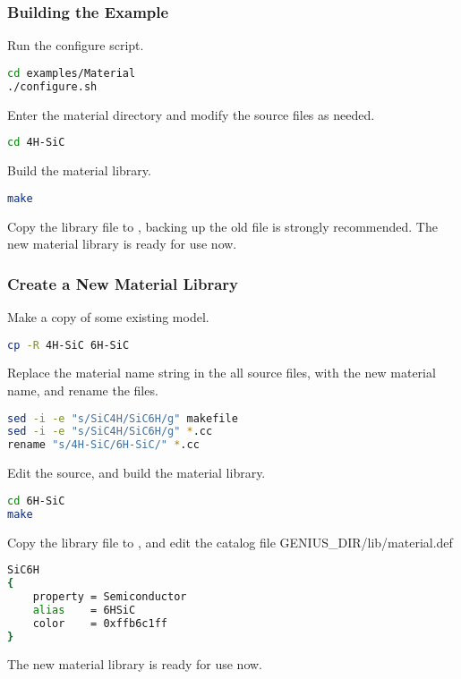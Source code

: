 \documentclass[oneside,12pt]{cgd_book}
\begin{document}
\subsubsection{Building the Example}
Run the configure script.
\par
\par
\begin{lstlisting}[language=sh]
cd examples/Material
./configure.sh
\end{lstlisting}
Enter the material directory and modify the source files as needed.
\par
\par
\begin{lstlisting}[language=sh]
cd 4H-SiC
\end{lstlisting}
Build the material library.
\par
\par
\begin{lstlisting}[language=sh]
make
\end{lstlisting}
\par
{}Copy the library file 
to ,
            backing up the old file is strongly recommended. The new material library is ready for use now.
\par
\par
\subsubsection{Create a New Material Library}
\par
{}Make a copy of some existing model.
\par
\par
\begin{lstlisting}[language=sh]
cp -R 4H-SiC 6H-SiC
\end{lstlisting}
Replace the material name string in the all source files, with the new material name, and rename the
            files.
\par
\par
\begin{lstlisting}[language=sh]
sed -i -e "s/SiC4H/SiC6H/g" makefile
sed -i -e "s/SiC4H/SiC6H/g" *.cc
rename "s/4H-SiC/6H-SiC/" *.cc
\end{lstlisting}
Edit the source, and build the material library.
\par
\par
\begin{lstlisting}[language=sh]
cd 6H-SiC
make
\end{lstlisting}
Copy the library file 
to ,
                and edit the catalog file \textdollar{}GENIUS\_DIR/lib/material.def
\par
\par
\begin{lstlisting}[language=sh]
SiC6H
{
    property = Semiconductor
    alias    = 6HSiC
    color    = 0xffb6c1ff
}
\end{lstlisting}
The new material library is ready for use now.
\par
\par
\end{document}
